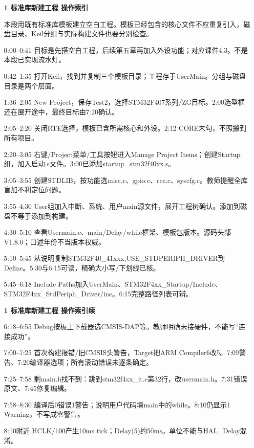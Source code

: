 \documentclass[10pt,a4paper]{article}
\newcommand{\qtitle}[1]{{\Large\bfseries #1}\par\vspace{4pt}}
\begin{document}
\clearpage
{}
\qtitle{1 标准库新建工程 操作索引}
本段用既有标准库模板建立空白工程。模板已经包含的核心文件不应重复引入，磁盘目录、Keil分组与实际构建文件也要分别检查。

0:00–0:41  目标是先搭空白工程，后续第五章再加入外设功能；对应课件4.3。不是本段已实现流水灯。

0:42–1:35  打开Keil，找到并复制三个模板目录；工程存于UserMain。分组与磁盘目录是两个层面。

1:36–2:05  New Project，保存Test2，选择STM32F407系列/\allowbreak{}ZG目标。2:00选型框还在展开途中，最终目标由7:20确认。

2:05–2:20  关闭RTE选择，模板已含所需核心和外设。2:12 CORE未勾，不照搬到所有项目。

2:20–3:05  右键/\allowbreak{}Project菜单/\allowbreak{}工具按钮进入Manage Project Items；创建Startup组，加入启动.s文件。3:00已添加startup\_\allowbreak{}stm32f40xx.s。

3:05–3:55  创建STDLIB，按功能选misc.c、gpio.c、rcc.c、syscfg.c。教师提醒全库盲加不利定位问题。

3:55–4:30  User组加入中断、系统、用户main源文件，展开工程树确认。添加到磁盘不等于添加到构建。

4:30–5:10  查看Usermain.c、main/\allowbreak{}Delay/\allowbreak{}while框架、模板包版本。源码头部V1.8.0；口述年份不当版本权威。

5:10–5:45  从说明复制STM32F40\_\allowbreak{}41xxx,USE\_\allowbreak{}STDPERIPH\_\allowbreak{}DRIVER到Define。5:30与6:15可读，精确大小写/\allowbreak{}下划线已核。

5:45–6:18  Include Paths加入UserMain、STM32F4xx\_\allowbreak{}Startup/\allowbreak{}Include、STM32F4xx\_\allowbreak{}StdPeriph\_\allowbreak{}Driver/\allowbreak{}inc。6:15完整路径列表可辨。


\clearpage
{}
\qtitle{1 标准库新建工程 操作索引续}
6:18–6:55  Debug按板上下载器选CMSIS-DAP等。教师明确未接硬件，不能写“连接成功”。

7:00–7:25  首次构建报错/\allowbreak{}旧CMSIS头警告，Target把ARM Compiler6改5。7:09警告、7:20编译器选项；所有滚动错误未逐条确定。

7:25–7:58  剩main.h找不到：跳到stm32f4xx\_\allowbreak{}it.c第32行，改usermain.h。7:31错误原文、7:45修复编辑。

7:58–8:30  编译后0错误1警告；说明用户代码填main中的while。8:10仍显示1 Warning，不写成零警告。

8:10附近  HCLK/\allowbreak{}100产生10ms tick；Delay(5)约50ms。单位不能与HAL\_\allowbreak{}Delay混淆。
\end{document}
